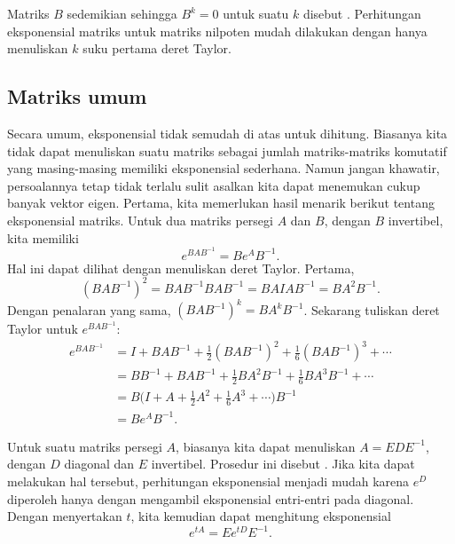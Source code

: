 Matriks $B$ sedemikian sehingga $B^k = 0$ untuk suatu $k$ disebut
\emph{}.  Perhitungan eksponensial matriks untuk
matriks nilpoten mudah dilakukan dengan hanya menuliskan $k$ suku pertama
deret Taylor.

\subsection{Matriks umum}

Secara umum, eksponensial tidak semudah di atas untuk dihitung.  Biasanya kita
tidak dapat menuliskan suatu matriks sebagai jumlah matriks-matriks komutatif yang masing-masing
memiliki eksponensial sederhana.  Namun jangan khawatir, persoalannya tetap tidak terlalu sulit asalkan
kita dapat menemukan cukup banyak vektor eigen.  Pertama, kita memerlukan hasil menarik berikut
tentang eksponensial matriks.  Untuk dua matriks persegi $A$ dan $B$, dengan
$B$ invertibel,
kita memiliki
\begin{equation*}
e^{BAB^{-1}} = B e^A B^{-1} .
\end{equation*}
Hal ini dapat dilihat dengan menuliskan deret Taylor.  Pertama, 
\begin{equation*}
{(BAB^{-1})}^2 =
BAB^{-1} BAB^{-1} =
BAIAB^{-1} =
BA^2B^{-1} .
\end{equation*}
Dengan penalaran yang sama, ${(BAB^{-1})}^k = B A^k B^{-1}$.  Sekarang tuliskan 
deret Taylor untuk
$e^{BAB^{-1}}$:
\begin{equation*}
\begin{split}
e^{BAB^{-1}} & =
I + {BAB^{-1}} + \frac{1}{2} {(BAB^{-1})}^2 + 
\frac{1}{6} {(BAB^{-1})}^3 + \cdots
\\
& =
BB^{-1} + {BAB^{-1}} + \frac{1}{2} BA^2B^{-1} + 
\frac{1}{6} BA^3B^{-1} + \cdots
\\
& =
B \bigl(
I + A + \frac{1}{2} A^2 + 
\frac{1}{6} A^3 + \cdots \bigr) B^{-1} \\
& = B e^A B^{-1} .
\end{split}
\end{equation*}

Untuk suatu matriks persegi $A$, 
biasanya kita dapat menuliskan $A = E D E^{-1}$, dengan $D$
diagonal dan $E$ invertibel.
Prosedur ini disebut \emph{}.
Jika kita dapat melakukan
hal tersebut, perhitungan
eksponensial menjadi mudah karena $e^D$ diperoleh hanya dengan mengambil eksponensial
entri-entri pada diagonal.  Dengan menyertakan $t$, 
kita kemudian dapat menghitung eksponensial
\begin{equation*}
e^{tA} = E e^{tD} E^{-1} .
\end{equation*}

